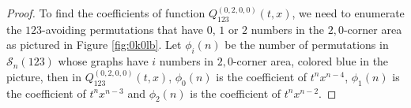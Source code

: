 \documentclass[
final,nomarks
]{dmtcs-episciences}
\newcommand{\fref}[1]{Figure \ref{fig:#1}}
\newcommand{\Sn}[1]{\mathcal{S}_{#1}}
\newcommand{\Qm}[1]{Q_{123}^{(#1)}(t,x)}
\begin{document}
\begin{proof}
	To find the coefficients of function \begin{math}\Qm{0,2,0,0}\end{math}, we need to enumerate the \begin{math}123\end{math}-avoiding permutations that have \begin{math}0\end{math}, \begin{math}1\end{math} or \begin{math}2\end{math} numbers in the \begin{math}2,0\end{math}-corner area as pictured in \fref{0k0lb}. 
	Let \begin{math}\phi_i(n)\end{math} be the number of permutations in \begin{math}\Sn{n}(123)\end{math} whose graphs have \begin{math}i\end{math} numbers in \begin{math}2,0\end{math}-corner area, colored blue in the picture, then in \begin{math}\Qm{0,2,0,0}\end{math}, \begin{math}\phi_0(n)\end{math} is the coefficient of \begin{math}t^n x^{n-4}\end{math}, \begin{math}\phi_1(n)\end{math} is the coefficient of \begin{math}t^n x^{n-3}\end{math} and \begin{math}\phi_2(n)\end{math} is the coefficient of \begin{math}t^n x^{n-2}\end{math}. 
	

\end{proof}
\end{document}
